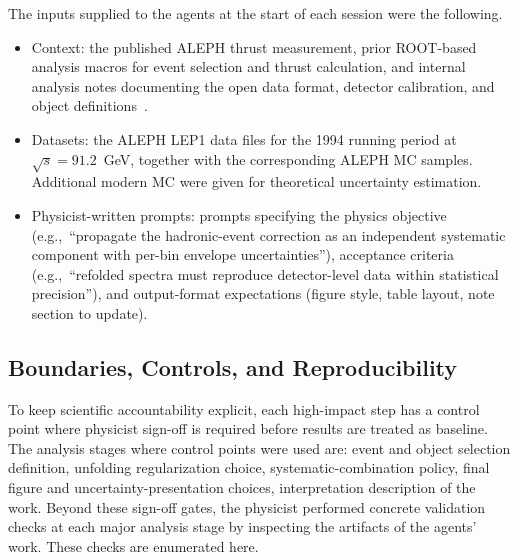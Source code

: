 The inputs supplied to the agents at the start of each session were the following.
\begin{itemize}
\item Context: the published ALEPH thrust measurement, prior ROOT-based analysis macros for event selection and thrust calculation, and internal analysis notes documenting the open data format, detector calibration, and object definitions~\cite{Heister:2003aj,ALEPH:docs}.
\item Datasets: the ALEPH LEP1 data files for the 1994 running period at $\sqrt{s}=91.2$~GeV, together with the corresponding ALEPH MC samples. Additional modern MC were given for theoretical uncertainty estimation.
\item Physicist-written prompts: prompts specifying the physics objective (e.g.,\ ``propagate the hadronic-event correction as an independent systematic component with per-bin envelope uncertainties''), acceptance criteria (e.g.,\ ``refolded spectra must reproduce detector-level data within statistical precision''), and output-format expectations (figure style, table layout, note section to update).
\end{itemize}

\subsection{Boundaries, Controls, and Reproducibility}

To keep scientific accountability explicit, each high-impact step has a control point where physicist sign-off is required before results are treated as baseline. The analysis stages where control points were used are: event and object selection definition, unfolding regularization choice, systematic-combination policy, final figure and uncertainty-presentation choices, interpretation description of the work. Beyond these sign-off gates, the physicist performed concrete validation checks at each major analysis stage by inspecting the artifacts of the agents' work. These checks are enumerated here.

